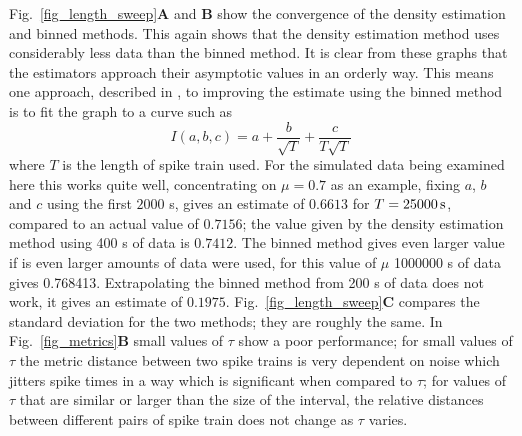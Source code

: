 \documentclass[12pt]{article}
\newcommand{\s}{\mbox{\,s}}
\begin{document}
Fig.~\ref{fig_length_sweep}\textbf{A} and \textbf{B} show the
convergence of the density estimation and binned methods. This again shows that the
density estimation method uses considerably less data than the binned method. It is
clear from these graphs that the estimators approach their asymptotic
values in an orderly way. This means one approach, described in
\cite{TrevesPanzeri1995,StrongEtAl1998,PanzeriEtAl2007}, to improving the estimate
using the binned method is to fit the graph to a curve such as
\begin{equation}
I(a,b,c)=a+\frac{b}{\sqrt{T}}+\frac{c}{T\sqrt{T}}
\end{equation}
where $T$ is the length of spike train used. For the simulated data
being examined here this works quite well, concentrating on $\mu=0.7$
as an example, fixing $a$, $b$ and $c$ using the first $2000$ s, gives
an estimate of $0.6613$ for $T=25000\s$, compared to an actual value
of $0.7156$; the value given by the density estimation method using
400 s of data is $0.7412$. The binned method gives even larger value
if is even larger amounts of data were used, for this value of $\mu$
1000000 s of data gives 0.768413. Extrapolating the binned method from
200 s of data does not work, it gives an estimate of
$0.1975$. Fig.~\ref{fig_length_sweep}\textbf{C} compares the standard
deviation for the two methods; they are roughly the same. In Fig.~\ref{fig_metrics}\textbf{B} small values of
$\tau$ show a poor performance; for small values of $\tau$ the metric
distance between two spike trains is very dependent on noise which
jitters spike times in a way which is significant when compared to
$\tau$; for values of $\tau$ that are similar or larger than the size
of the interval, the relative distances between different pairs of
spike train does not change as $\tau$ varies.
\end{document}

